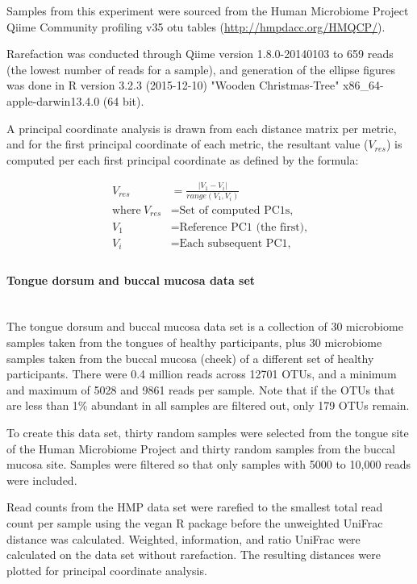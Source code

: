 \documentclass[10pt,letterpaper]{article}
\begin{document}
Samples from this experiment were sourced from the Human Microbiome Project \cite{turnbaugh2007human} Qiime Community profiling v35 otu tables (\url{http://hmpdacc.org/HMQCP/}).

Rarefaction was conducted through Qiime version 1.8.0-20140103 to 659 reads (the lowest number of reads for a sample), and generation of the ellipse figures was done in R version 3.2.3 (2015-12-10) "Wooden Christmas-Tree" x86\_64-apple-darwin13.4.0 (64 bit).

A principal coordinate analysis is drawn from each distance matrix per metric, and for the first principal coordinate of each metric, the resultant value ($V_{res}$) is computed per each first principal coordinate as defined by the formula:

\begin{align*}
  V_{res} &=\frac{|V_1 - V_i|}{range(V_1, V_i)} \\
  \text{where}~V_{res}&= \text{Set of computed PC1s,} \\
  V_1 &= \text{Reference PC1 (the first),} \\
  V_i &= \text{Each subsequent PC1,} \\
\end{align*}

\paragraph{Tongue dorsum and buccal mucosa data set}\mbox{}\\
The tongue dorsum and buccal mucosa data set is a collection of 30 microbiome samples taken from the tongues of healthy participants, plus 30 microbiome samples taken from the buccal mucosa (cheek) of a different set of healthy participants. There were 0.4 million reads across 12701 OTUs, and a minimum and maximum of 5028 and 9861 reads per sample. Note that if the OTUs that are less than 1\% abundant in all samples are filtered out, only 179 OTUs remain.

To create this data set, thirty random samples were selected from the tongue site of the Human Microbiome Project \cite{turnbaugh2007human} and thirty random samples from the buccal mucosa site. Samples were filtered so that only samples with 5000 to 10,000 reads were included.

Read counts from the HMP data set were rarefied to the smallest total read count per sample using the vegan R package \cite{oksanen2007vegan} before the unweighted UniFrac distance was calculated. Weighted, information, and ratio UniFrac were calculated on the data set without rarefaction. The resulting distances were plotted for principal coordinate analysis.
\end{document}

